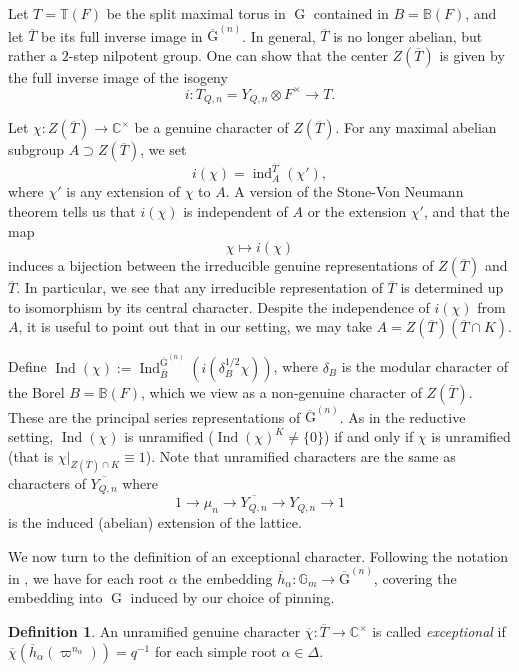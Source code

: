 \documentclass[11pt,reqno]{amsart}
\theoremstyle{definition}
\newtheorem{Def}[Thm]{Definition}
\theoremstyle{remark}
\theoremstyle{definition}
\begin{document}
Let $T=\mathbb{T}(F)$ be the split maximal torus in $\operatorname{G}$ contained in $B=\mathbb{B}(F)$, and let $\overline{T}$ be its full inverse image in ${\overline{\mathrm{G}}^{(n)}}$. In general, $\overline{T}$ is no longer abelian, but rather a $2$-step nilpotent group.  One can show that the center $Z(\overline{T})$ is given by the full inverse image of the isogeny $$i: T_{Q,n}=Y_{Q,n}\otimes F^\times \to T.$$ 

Let $\chi : Z(\overline{T})\to {\mathbb C}^\times$ be a genuine character of $Z(\overline{T})$. For any maximal abelian subgroup $A\supset Z(\overline{T})$, we set 
\[
i(\chi)=\operatorname{ind}_A^{\overline{T}}(\chi'),
\]
where $\chi'$ is any extension of $\chi$ to $A$. A version of the Stone-Von Neumann theorem tells us that $i(\chi)$ is independent of $A$ or the extension $\chi'$, and that the map
\[
\chi \mapsto i(\chi)
\]
induces a bijection between the irreducible genuine representations of $Z(\overline{T})$ and $\overline{T}$. In particular, we see that any irreducible representation of $\overline{T}$ is determined up to isomorphism by its central character. Despite the independence of $i(\chi)$ from $A$, it is useful to point out that in our setting, we may take $A = Z(\overline{T})(\overline{T}\cap K)$.

Define $\operatorname{Ind}(\chi) := \operatorname{Ind}_{\overline{B}}^{\overline{\mathrm{G}}^{(n)}}(i(\delta_B^{1/2}\chi))$, where $\delta_B$ is the modular character of the Borel $B = \mathbb{B}(F)$, which we view as a non-genuine character of $Z(\overline{T})$. These are the principal series representations of ${\overline{\mathrm{G}}^{(n)}}$. As in the reductive setting, $\operatorname{Ind}(\chi)$ is unramified ($\operatorname{Ind}(\chi)^K \neq\{0\}$) if and only if $\chi$ is unramified (that is $\chi|_{Z(\overline{T})\cap K} \equiv 1$). Note that unramified characters are the same as characters of $\overline{Y_{Q,n}}$ where
\[
1{\longrightarrow} \mu_n {\longrightarrow} \overline{Y_{Q,n}}{\longrightarrow} Y_{Q,n}{\longrightarrow} 1
\]
is the induced (abelian) extension of the lattice.

We now turn to the definition of an exceptional character. Following the notation in \cite{Gao}, we have for each root ${\alpha}$ the embedding $\overline{h}_{\alpha}: \mathbb{G}_m \to {\overline{\mathrm{G}}^{(n)}}$, covering the embedding into $\operatorname{G}$ induced by our choice of pinning. 
\begin{Def}
An unramified genuine character $\overline{\chi}:\overline{T}\to {\mathbb C}^\times$ is called \emph{exceptional} if $\overline{\chi}(\overline{h}_{\alpha}(\varpi^{n_{\alpha}}))=q^{-1}$ for each simple root ${\alpha}\in \Delta$.
\end{Def}
\end{document}
